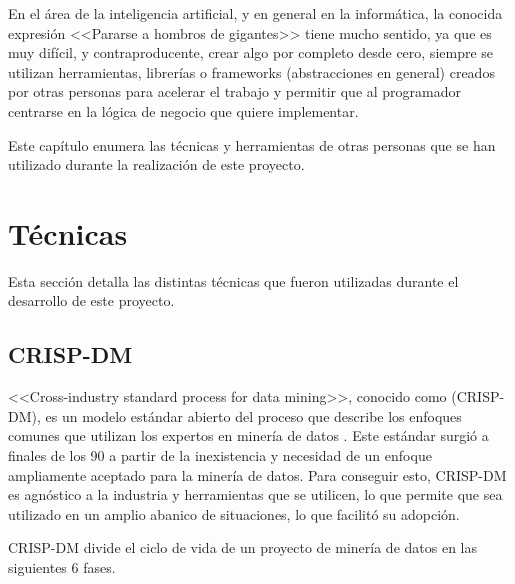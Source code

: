 \label{cha:Técnicas y herraminetas}

En el área de la inteligencia artificial, y en general en la informática, la
conocida expresión <<Pararse a hombros de gigantes>> tiene mucho sentido, ya que
es muy difícil, y contraproducente, crear algo por completo desde cero, siempre
se utilizan herramientas, librerías o frameworks (abstracciones en general)
creados por otras personas para acelerar el trabajo y permitir que al
programador centrarse en la lógica de negocio que quiere implementar.

Este capítulo enumera las técnicas y herramientas de otras personas que se han
utilizado durante la realización de este proyecto.

\section{Técnicas}

Esta sección detalla las distintas técnicas que fueron utilizadas durante el
desarrollo de este proyecto.

\subsection{CRISP-DM}

<<Cross-industry standard process for data mining>>, conocido como (CRISP-DM),
es un modelo estándar abierto del proceso que describe los enfoques comunes que
utilizan los expertos en minería de datos \cite{shearer2000crisp}. Este estándar
surgió a finales de los 90 a partir de la inexistencia y necesidad de un enfoque
ampliamente aceptado para la minería de datos. Para conseguir esto, CRISP-DM es
agnóstico a la industria y herramientas que se utilicen, lo que permite que sea
utilizado en un amplio abanico de situaciones, lo que facilitó su adopción.

CRISP-DM divide el ciclo de vida de un proyecto de minería de datos en las
siguientes 6 fases.


